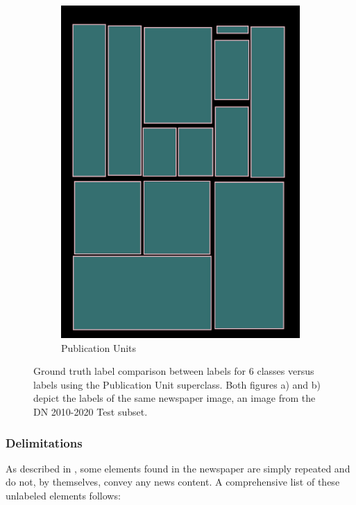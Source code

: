 \documentclass[oneside, english, bibtex]{kththesis}
\begin{document}
\begin{figure}[H]
\begin{adjustbox}{center}
{\begin{subfigure}{0.5\textwidth}
  \includegraphics[width=\linewidth, clip=true, trim = 0mm 0mm 0mm 0mm]{figures/1c_bbox/kvtooQ3.jpg}
  \caption{Publication Units}
  \label{fig:kvtooQ3_1c}
\end{subfigure}}
\end{adjustbox}
  \caption{Ground truth label comparison between labels for 6 classes versus labels using the Publication Unit superclass. Both figures a) and b) depict the labels of the same newspaper image, an image from the DN 2010-2020 Test subset. }
\label{fig:pubunit}
\end{figure}


\subsubsection{Delimitations}

As described in , some elements found in the newspaper are simply repeated and do not, by themselves, convey any news content.
A comprehensive list of these unlabeled elements follows:
\end{document}
